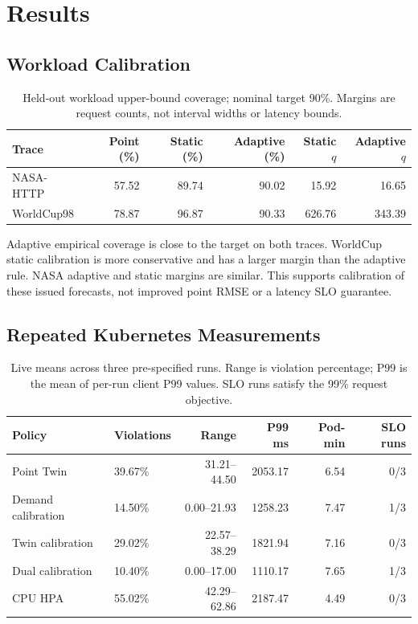 \documentclass[11pt,a4paper]{article}
\begin{document}
\section{Results}
\subsection{Workload Calibration}


\begin{table}[htbp]\centering\small\setlength{\tabcolsep}{4pt}
\caption{Held-out workload upper-bound coverage; nominal target 90\%. Margins are request counts, not interval widths or latency bounds.}\label{tab:coverage}
\begin{tabular}{lrrrrr}\toprule
Trace & Point (\%) & Static (\%) & Adaptive (\%) & Static $q$ & Adaptive $q$\\\midrule
NASA-HTTP & 57.52 & 89.74 & 90.02 & 15.92 & 16.65\\
WorldCup98 & 78.87 & 96.87 & 90.33 & 626.76 & 343.39\\
\bottomrule\end{tabular}\end{table}

Adaptive empirical coverage is close to the target on both traces. WorldCup static calibration is more conservative and has a larger margin than the adaptive rule. NASA adaptive and static margins are similar. This supports calibration of these issued forecasts, not improved point RMSE or a latency SLO guarantee.
\subsection{Repeated Kubernetes Measurements}

\begin{table}[htbp]\centering\small\setlength{\tabcolsep}{4pt}
\caption{Live means across three pre-specified runs. Range is violation percentage; P99 is the mean of per-run client P99 values. SLO runs satisfy the 99\% request objective.}\label{tab:live}
\begin{tabular}{llrrrr}\toprule
Policy & Violations & Range & P99 ms & Pod-min & SLO runs\\\midrule
Point Twin & 39.67\% & 31.21--44.50 & 2053.17 & 6.54 & 0/3\\
Demand calibration & 14.50\% & 0.00--21.93 & 1258.23 & 7.47 & 1/3\\
Twin calibration & 29.02\% & 22.57--38.29 & 1821.94 & 7.16 & 0/3\\
Dual calibration & 10.40\% & 0.00--17.00 & 1110.17 & 7.65 & 1/3\\
CPU HPA & 55.02\% & 42.29--62.86 & 2187.47 & 4.49 & 0/3\\
\bottomrule\end{tabular}\end{table}
\end{document}
